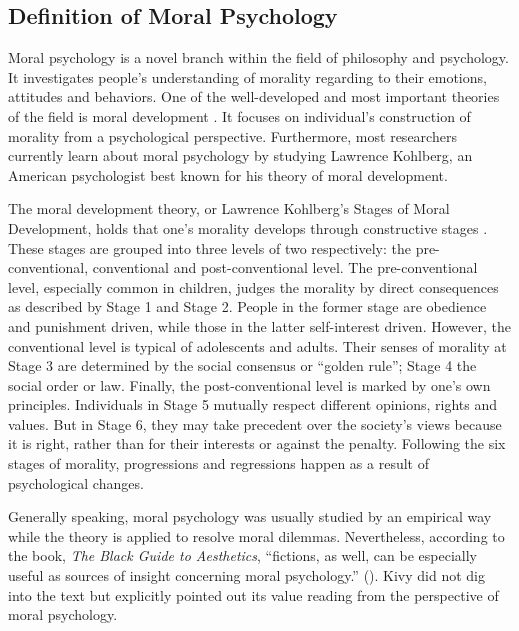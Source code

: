 \subsection{Definition of Moral Psychology} %
\label{sub:definition_of_moral_psychology}
\begin{text}

Moral psychology is a novel branch within the field of philosophy and psychology. It investigates people's understanding of morality regarding to their emotions, attitudes and behaviors. One of the well-developed and most important theories of the field is moral development . It focuses on individual's construction of morality from a psychological perspective. Furthermore, most researchers currently learn about moral psychology by studying Lawrence Kohlberg, an American psychologist best known for his theory of moral development.

The moral development theory, or Lawrence Kohlberg's Stages of Moral Development, holds that one's morality develops through constructive stages \citep{kohlberg1958development}. These stages are grouped into three levels of two respectively: the pre-conventional, conventional and post-conventional level. The pre-conventional level, especially common in children, judges the morality by direct consequences as described by Stage 1 and Stage 2. People in the former stage are obedience and punishment driven, while those in the latter self-interest driven. However, the conventional level is typical of adolescents and adults. Their senses of morality at Stage 3 are determined by the social consensus or ``golden rule''; Stage 4 the social order or law. Finally, the post-conventional level is marked by one's own principles. Individuals in Stage 5 mutually respect different opinions, rights and values. But in Stage 6, they may take precedent over the society's views because it is right, rather than for their interests or against the penalty. Following the six stages of morality, progressions and regressions happen as a result of psychological changes.

Generally speaking, moral psychology was usually studied by an empirical way while the theory is applied to resolve moral dilemmas. Nevertheless, according to the book, \textit{The Black Guide to Aesthetics}, ``fictions, as well, can be especially useful as sources of insight concerning moral psychology.'' (). Kivy did not dig into the text but explicitly pointed out its value reading from the perspective of moral psychology.

\end{text}
